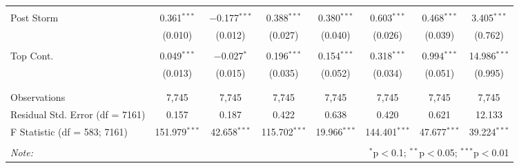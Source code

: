 \begin{table}[!htbp]
\begin{tabular}{@{\extracolsep{5pt}}lccccccc}
  & & & & & & & \\ 
 Post Storm & 0.361$^{***}$ & $-$0.177$^{***}$ & 0.388$^{***}$ & 0.380$^{***}$ & 0.603$^{***}$ & 0.468$^{***}$ & 3.405$^{***}$ \\ 
  & (0.010) & (0.012) & (0.027) & (0.040) & (0.026) & (0.039) & (0.762) \\ 
  & & & & & & & \\ 
 Top Cont. & 0.049$^{***}$ & $-$0.027$^{*}$ & 0.196$^{***}$ & 0.154$^{***}$ & 0.318$^{***}$ & 0.994$^{***}$ & 14.986$^{***}$ \\ 
  & (0.013) & (0.015) & (0.035) & (0.052) & (0.034) & (0.051) & (0.995) \\ 
  & & & & & & & \\ 
\hline \\[-1.8ex] 
Observations & 7,745 & 7,745 & 7,745 & 7,745 & 7,745 & 7,745 & 7,745 \\ 
Residual Std. Error (df = 7161) & 0.157 & 0.187 & 0.422 & 0.638 & 0.420 & 0.621 & 12.133 \\ 
F Statistic (df = 583; 7161) & 151.979$^{***}$ & 42.658$^{***}$ & 115.702$^{***}$ & 19.966$^{***}$ & 144.401$^{***}$ & 47.677$^{***}$ & 39.224$^{***}$ \\ 
\hline 
\hline \\[-1.8ex] 
\textit{Note:}  & \multicolumn{7}{r}{$^{*}$p$<$0.1; $^{**}$p$<$0.05; $^{***}$p$<$0.01} \\ 
\end{tabular} 
\end{table} 
